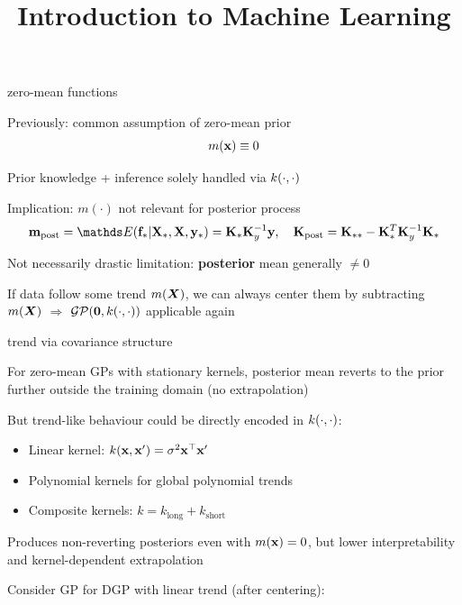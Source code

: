 \documentclass[11pt,compress,t,notes=noshow, xcolor=table]{beamer}
\title{Introduction to Machine Learning}
\begin{document}


\begin{framei}[sep=L]{zero-mean functions}
\item Previously: common assumption of zero-mean prior $$m(\mathbf{x}) \equiv 0$$
\item Prior knowledge + inference solely handled via $k(\cdot, \cdot)$
\item Implication: $m(\cdot)$ not relevant for posterior process
$$\mv_{\text{post}} = \E(\fs | \Xs, \Xmat, \ys) = \Ks \Ky^{-1} \yv, \quad \Kmat_{\text{post}} = \Kss - \Ks^T \Ky^{-1} \Ks$$
\item Not necessarily drastic limitation: \textbf{posterior} mean generally $\neq 0$
\item If data follow some trend $m(\bm{X})$, we can always center them by subtracting $m(\bm{X})$ $\Rightarrow$ $\mathcal{GP}(\mathbf{0}, k(\cdot, \cdot))$ applicable again
\end{framei}



\begin{framei}[sep=S]{trend via covariance structure}
\item For zero-mean GPs with stationary kernels, posterior mean reverts to the prior further outside the training domain (no extrapolation)
\item But trend-like behaviour could be directly encoded in $k(\cdot, \cdot)$:
\begin{itemize}
  \item Linear kernel: $k(\mathbf{x},\mathbf{x}')=\sigma^2 \mathbf{x}^\top \mathbf{x}'$
  \item Polynomial kernels for global polynomial trends
  \item Composite kernels: $k = k_{\text{long}} + k_{\text{short}}$
\end{itemize}
\item Produces non-reverting posteriors even with $m(\mathbf{x})=0$, but lower interpretability and kernel-dependent extrapolation
\item Consider GP for DGP with linear trend (after centering):

\vfill


\end{framei}
\end{document}
